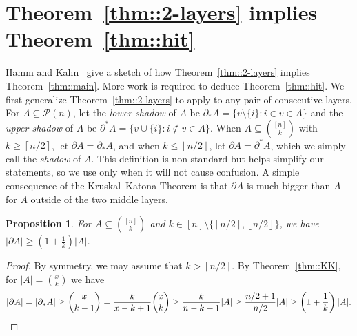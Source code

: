 \documentclass[12pt]{article}
\renewcommand{\P}{\mathcal{P}}
\newcommand{\floor}[1]{\left\lfloor#1\right\rfloor}
\newcommand{\ceil}[1]{\left\lceil#1\right\rceil}
\newtheorem{proposition}[theorem]{Proposition}
\begin{document}
\section{Theorem~\ref{thm::2-layers} implies Theorem~\ref{thm::hit}}\label{sec::reduction}

Hamm and Kahn~\cite{HK2} give a sketch of how Theorem~\ref{thm::2-layers} implies Theorem~\ref{thm::main}. More work is required to deduce Theorem~\ref{thm::hit}. We first generalize Theorem~\ref{thm::2-layers} to apply to any pair of consecutive layers. For $A \subseteq \P(n)$, let the \emph{lower shadow} of $A$ be $\partial_* A = \{v \setminus \{i\} : i \in v \in A\}$ and the \emph{upper shadow} of $A$ be $\partial^* A = \{v \cup \{i\} : i \not\in v \in A\}$. When $A \subseteq \binom{[n]}{k}$ with $k \geq \ceil{n/2}$, let $\partial A = \partial_* A$, and when $k \leq \floor{n/2}$, let $\partial A = \partial^* A$, which we simply call the \emph{shadow} of $A$. This definition is non-standard but helps simplify our statements, so we use only when it will not cause confusion. A simple consequence of the Kruskal--Katona Theorem is that $\partial A$ is much bigger than $A$ for $A$ outside of the two middle layers.

\begin{proposition}\label{prop::expoutmid}
For $A \subseteq \binom{[n]}{k}$ and $k \in [n] \setminus \{\ceil{n/2},\floor{n/2}\}$, we have $|\partial A| \geq \left(1+\frac{1}{k}\right)|A|$.
\end{proposition}

\begin{proof}
By symmetry, we may assume that $k>\ceil{n/2}$. By Theorem~\ref{thm::KK}, for $|A| = \binom{x}{k}$ we have
\[ |\partial A| = |\partial_* A| \geq \binom{x}{k-1} = \frac{k}{x-k+1} \binom{x}{k} \geq \frac{k}{n-k+1} |A| \geq \frac{n/2+1}{n/2} |A| \geq \left( 1 + \frac{1}{k} \right) |A| .\qedhere\]
\end{proof}
\end{document}
